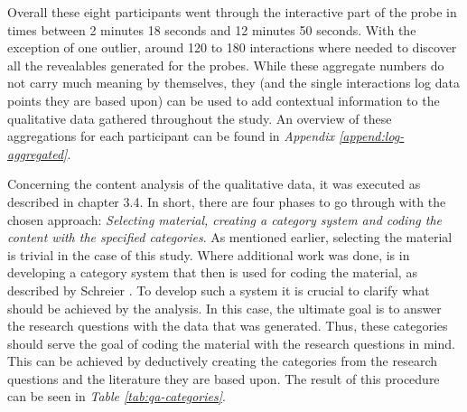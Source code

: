 Overall these eight participants went through the interactive part of the probe in times between 2 minutes 18 seconds and 12 minutes 50 seconds. With the exception of one outlier, around 120 to 180 interactions where needed to discover all the revealables generated for the probes. While these aggregate numbers do not carry much meaning by themselves, they (and the single interactions log data points they are based upon) can be used to add contextual information to the qualitative data gathered throughout the study. An overview of these aggregations for each participant can be found in \textit{Appendix \ref{append:log-aggregated}}.

Concerning the content analysis of the qualitative data, it was executed as described in chapter 3.4. In short, there are four phases to go through with the chosen approach: \textit{Selecting material, creating a category system and coding the content with the specified categories}. As mentioned earlier, selecting the material is trivial in the case of this study. Where additional work was done, is in developing a category system that then is used for coding the material, as described by Schreier \cite[p. 174]{schreier2014ways}. To develop such a system it is crucial to clarify what should be achieved by the analysis. In this case, the ultimate goal is to answer the research questions with the data that was generated. Thus, these categories should serve the goal of coding the material with the research questions in mind. This can be achieved by deductively creating the categories from the research questions and the literature they are based upon. The result of this procedure can be seen in \textit{Table \ref{tab:qa-categories}}.

